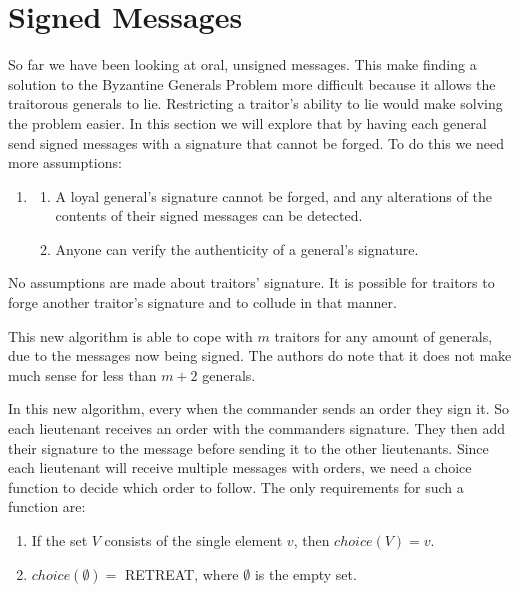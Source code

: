 \documentclass[10pt]{amsart}
\begin{document}
\section{Signed Messages}

So far we have been looking at oral, unsigned messages. This make finding a solution to the Byzantine
Generals Problem more difficult because it allows the traitorous generals to lie. Restricting a
traitor's ability to lie would make solving the problem easier. In this section we will explore that
by having each general send signed messages with a signature that cannot be forged. To do this we
need more assumptions:

\begin{enumerate}[label={A4.}]
    \item {
        \begin{enumerate}[label={(\alph*)}]
            \item {
                A loyal general's signature cannot be forged, and any alterations of the contents of
                their signed messages can be detected.
            }
            \item Anyone can verify the authenticity of a general's signature.
        \end{enumerate}
    }
\end{enumerate}

No assumptions are made about traitors' signature. It is possible for traitors to forge another
traitor's signature and to collude in that manner.

This new algorithm is able to cope with $m$ traitors for any amount of generals, due to the messages
now being signed. The authors do note that it does not make much sense for less than $m+2$ generals.

In this new algorithm, every when the commander sends an order they sign it. So each lieutenant receives
an order with the commanders signature. They then add their signature to the message before sending
it to the other lieutenants. Since each lieutenant will receive multiple messages with orders, we
need a choice function to decide which order to follow. The only requirements for such a function are:

\begin{enumerate}[label={\arabic{enumi}.}]
    \item If the set $V$ consists of the single element $v$, then $choice(V) = v$.
    \item $choice(\emptyset)=$ RETREAT, where $\emptyset$ is the empty set.
\end{enumerate}
\end{document}
